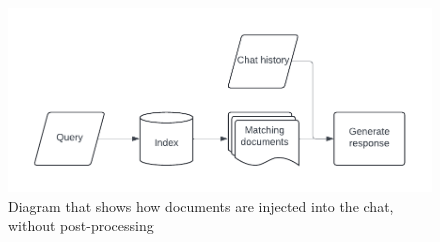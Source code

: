 
\begin{figure}[H]
    \centering
    \includegraphics[width=\textwidth]{content/figures/assets/10-without-post-processing.pdf}
    \caption{Diagram that shows how documents are injected into the chat, without post-processing}
    \label{fig:without_post_processing}
\end{figure}
